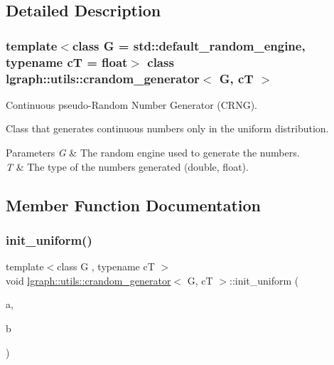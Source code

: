 \subsection{Detailed Description}
\subsubsection*{template$<$class G = std\+::default\+\_\+random\+\_\+engine, typename cT = float$>$\newline
class lgraph\+::utils\+::crandom\+\_\+generator$<$ G, c\+T $>$}

Continuous pseudo-\/\+Random Number Generator (C\+R\+NG). 

Class that generates continuous numbers only in the uniform distribution.


\begin{DoxyParams}{Parameters}
{\em G} & The random engine used to generate the numbers. \\
\hline
{\em T} & The type of the numbers generated (double, float). \\
\hline
\end{DoxyParams}


\subsection{Member Function Documentation}
\mbox{\label{classlgraph_1_1utils_1_1crandom__generator_addfa5951276296b2a164e5dc482728ce}} 
\subsubsection{\texorpdfstring{init\+\_\+uniform()}{init\_uniform()}}
{\footnotesize\ttfamily template$<$class G , typename cT $>$ \\
void \hyperlink{classlgraph_1_1utils_1_1crandom__generator}{lgraph\+::utils\+::crandom\+\_\+generator}$<$ G, cT $>$\+::init\+\_\+uniform (\begin{DoxyParamCaption}\item[{cT}]{a,  }\item[{cT}]{b }\end{DoxyParamCaption})\hspace{0.3cm}{\ttfamily [virtual]}}



